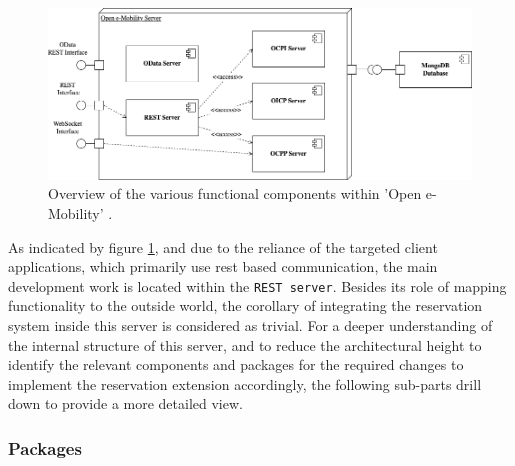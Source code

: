 \begin{figure}[h]
    \centering
    \includegraphics[scale=0.4]{resources/images/main/6_implementation/DeploymentView.png}
    \caption{Overview of the various functional components within 'Open e-Mobility' \cite{noauthor_open_2023}.}
    \label{fig:module-view}
\end{figure}

\noindent As indicated by figure \ref{fig:module-view}, and due to the reliance of the targeted client applications, which primarily use \acrshort{rest} based communication, the main development work is located within the \texttt{REST server}. 
Besides its role of mapping functionality to the outside world, the corollary of integrating the reservation system inside this server is considered as trivial.
For a deeper understanding of the internal structure of this server, and to reduce the architectural height to identify the relevant components and packages for the required changes to implement the reservation extension accordingly, the following sub-parts drill down to provide a more detailed view.

\subsubsection{Packages}
\label{ch:Implementation:sec:Reservation System:ssec:Architectural Views:sssec:Packages}

